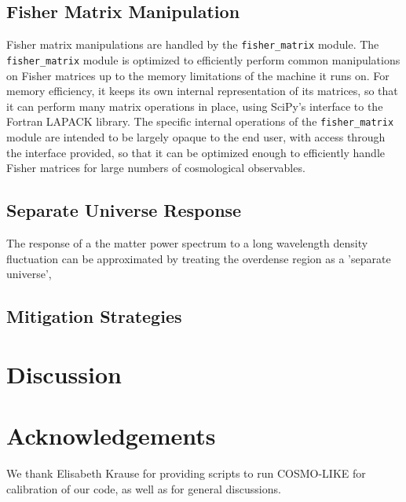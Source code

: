 \documentclass[a4paper,11pt]{article}
\begin{document}
\subsection{Fisher Matrix Manipulation}
Fisher matrix manipulations are handled by the \texttt{fisher\_matrix} module. The \texttt{fisher\_matrix} module is optimized to efficiently perform common manipulations on Fisher matrices up to the memory limitations of the machine it runs on. For memory efficiency, it keeps its own internal representation of its matrices, so that it can perform many matrix operations in place, using SciPy's interface to the Fortran LAPACK library.  The specific internal operations of the \texttt{fisher\_matrix} module are intended to be largely opaque to the end user, with access through the interface provided, so that it can be optimized enough to efficiently handle Fisher matrices for large numbers of cosmological observables. 


\subsection{Separate Universe Response}
The response of a the matter power spectrum to a long wavelength density fluctuation can be approximated by treating the overdense region as a 'separate universe', \cite{chiang_response}\cite{baldauf_response}


\subsection{Mitigation Strategies}
\section{Discussion} 

\section{Acknowledgements} 
We thank Elisabeth Krause for providing scripts to run COSMO-LIKE for calibration of our code, as well as for general discussions. 





\appendix 
\end{document}

